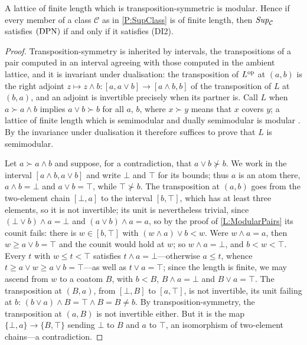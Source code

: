 \begin{proposition}
  \label{P:FiniteLength}  \leanok
  A lattice of finite length which is transposition-symmetric is modular. Hence if every member of a class \(\mathcal{C}\) as in \prox\ref{P:SupClass} is of finite length, then \(\mathit{Sup}_{\mathcal{C}}\) satisfies \(\textup{(DPN)}\) if and only if it satisfies \textup{(DI2)}.
\end{proposition}

\begin{proof}
  \leanok
  Transposition-symmetry is inherited by intervals, the transpositions of a pair computed in an interval agreeing with those computed in the ambient lattice, and it is invariant under dualisation: the transposition of \(L^{\operatorname{op}}\) at \((a,b)\) is the right adjoint \(z\mapsto z\wedge b\colon[a,a\vee b]\to[a\wedge b,b]\) of the transposition of \(L\) at \((b,a)\), and an adjoint is invertible precisely when its partner is. Call \(L\)  when \(a\succ a\wedge b\) implies \(a\vee b\succ b\) for all \(a\), \(b\), where \(x\succ y\) means that \(x\) covers \(y\); a lattice of finite length which is semimodular and dually semimodular is modular \cite[Chapter~II, Theorem~16]{Birkhoff}. By the invariance under dualisation it therefore suffices to prove that \(L\) is semimodular.

	Let \(a\succ a\wedge b\) and suppose, for a contradiction, that \(a\vee b\not\succ b\). We work in the interval \([a\wedge b,a\vee b]\) and write \(\bot\) and \(\top\) for its bounds; thus \(a\) is an atom there, \(a\wedge b=\bot\) and \(a\vee b=\top\), while \(\top\not\succ b\). The transposition at \((a,b)\) goes from the two-element chain \([\bot,a]\) to the interval \([b,\top]\), which has at least three elements, so it is not invertible; its unit is nevertheless trivial, since \((\bot\vee b)\wedge a=\bot\) and \((a\vee b)\wedge a=a\), so by the proof of \lemx\ref{L:ModularPairs} its counit fails: there is \(w\in[b,\top]\) with \((w\wedge a)\vee b<w\). Were \(w\wedge a=a\), then \(w\geq a\vee b=\top\) and the counit would hold at \(w\); so \(w\wedge a=\bot\), and \(b<w<\top\). Every \(t\) with \(w\leq t<\top\) satisfies \(t\wedge a=\bot\)---otherwise \(a\leq t\), whence \(t\geq a\vee w\geq a\vee b=\top\)---as well as \(t\vee a=\top\); since the length is finite, we may ascend from \(w\) to a coatom \(B\), with \(b<B\), \(B\wedge a=\bot\) and \(B\vee a=\top\). The transposition at \((B,a)\), from \([\bot,B]\) to \([a,\top]\), is not invertible, its unit failing at \(b\): \((b\vee a)\wedge B=\top\wedge B=B\neq b\). By transposition-symmetry, the transposition at \((a,B)\) is not invertible either. But it is the map \(\{\bot,a\}\to\{B,\top\}\) sending \(\bot\) to \(B\) and \(a\) to \(\top\), an isomorphism of two-element chains---a contradiction.
\end{proof}


